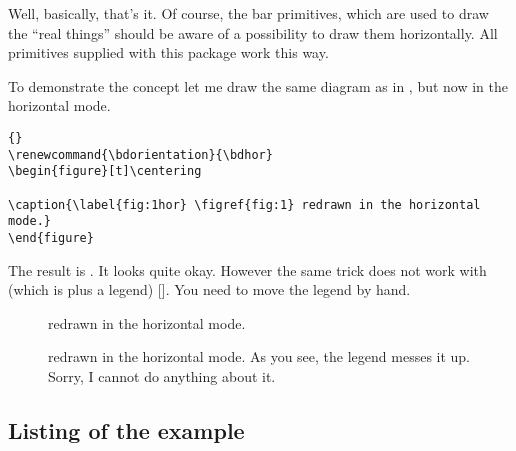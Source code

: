 \documentclass[12pt]{article}
\begin{document}
Well, basically, that's it. Of course, the bar primitives, which are
used to draw the ``real things'' should be aware of a possibility to
draw them horizontally. All primitives supplied with this package work
this way. 

To demonstrate the concept let me draw the same diagram as in 
, but now in the horizontal mode.

\begin{lstlisting}{}
\renewcommand{\bdorientation}{\bdhor}
\begin{figure}[t]\centering
  
\caption{\label{fig:1hor} \figref{fig:1} redrawn in the horizontal mode.}
\end{figure}
\end{lstlisting}

The result is . It looks quite okay. However the same
trick does not work 
with  (which is  
plus a legend) []. You need to move the legend by hand.


\renewcommand{\bdorientation}{\bdhor}
\begin{figure}[t]\centering
  
\caption{\label{fig:1hor}  redrawn in the horizontal mode.}
\end{figure}

\begin{figure}[t]\centering
  
\caption{\label{fig:4hor}  redrawn in the horizontal
  mode. As you see, the legend messes it up. Sorry, I cannot do
  anything about it.}
\end{figure}

\clearpage
\subsection{\label{sec:4:1}Listing of the example }

\end{document}
